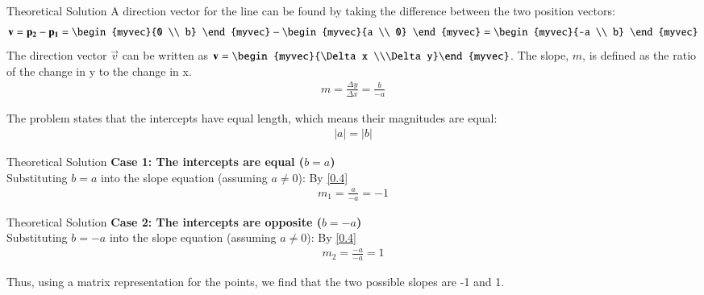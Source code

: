 \documentclass{beamer}
\begin{document}
	\begin{frame}{Theoretical Solution}
		A direction vector for the line can be found by taking the difference between the two position vectors:
		\begin{align}
			\vec{v} = \vec{p_2} - \vec{p_1} = \begin{myvec}{0 \\ b} \end{myvec} - \begin{myvec}{a \\ 0} \end{myvec} = \begin{myvec}{-a \\ b} \end{myvec} \label{eq:dir_vec}
		\end{align}
		The direction vector $\vec{v}$ can be written as $\vec{v} = \begin{myvec}{\Delta x \\\Delta y}\end{myvec}$. The slope, $m$, is defined as the ratio of the change in y to the change in x.
		\begin{align}
			m = \frac{\Delta y}{\Delta x} = \frac{b}{-a} \label{0.4}
		\end{align}
		
		The problem states that the intercepts have equal length, which means their magnitudes are equal:
		\begin{align}
			|a| = |b|
		\end{align}
	\end{frame}
	\begin{frame}{Theoretical Solution}
		\textbf{Case 1: The intercepts are equal ($b = a$)}\\
		Substituting $b=a$ into the slope equation (assuming $a \neq 0$):
		By \eqref{0.4}
		\begin{align}
			m_1 = \frac{a}{-a} = -1
		\end{align}
	\end{frame}
	\begin{frame}{Theoretical Solution}
	\textbf{Case 2: The intercepts are opposite ($b = -a$)}\\
Substituting $b=-a$ into the slope equation (assuming $a \neq 0$):
By \eqref{0.4}
\begin{align}
	m_2 = \frac{-a}{-a} = 1
\end{align}

Thus, using a matrix representation for the points, we find that the two possible slopes are -1 and 1.
	\end{frame}
\end{document}
